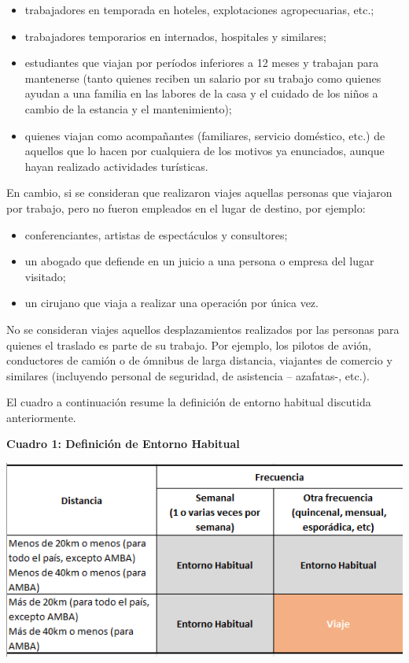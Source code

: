 \documentclass[
  openany]{book}
\begin{document}
\begin{itemize}
\item
  trabajadores en temporada en hoteles, explotaciones agropecuarias, etc.;
\item
  trabajadores temporarios en internados, hospitales y similares;
\item
  estudiantes que viajan por períodos inferiores a 12 meses y trabajan para mantenerse (tanto quienes reciben un salario por su trabajo como quienes ayudan a una familia en las labores de la casa y el cuidado de los niños a cambio de la estancia y el mantenimiento);
\item
  quienes viajan como acompañantes (familiares, servicio doméstico, etc.) de aquellos que lo hacen por cualquiera de los motivos ya enunciados, aunque hayan realizado actividades turísticas.
\end{itemize}

En cambio, si se consideran que realizaron viajes aquellas personas que viajaron por trabajo, pero no fueron empleados en el lugar de destino, por ejemplo:

\begin{itemize}
\item
  conferenciantes, artistas de espectáculos y consultores;
\item
  un abogado que defiende en un juicio a una persona o empresa del lugar visitado;
\item
  un cirujano que viaja a realizar una operación por única vez.
\end{itemize}

No se consideran viajes aquellos desplazamientos realizados por las personas para quienes el traslado es parte de su trabajo. Por ejemplo, los pilotos de avión, conductores de camión o de ómnibus de larga distancia, viajantes de comercio y similares (incluyendo personal de seguridad, de asistencia -- azafatas-, etc.).

El cuadro a continuación resume la definición de entorno habitual discutida anteriormente.

\textbf{Cuadro 1: Definición de Entorno Habitual}

\includegraphics{cuadros_graficos/01_entorno_habitual.png}
\end{document}
